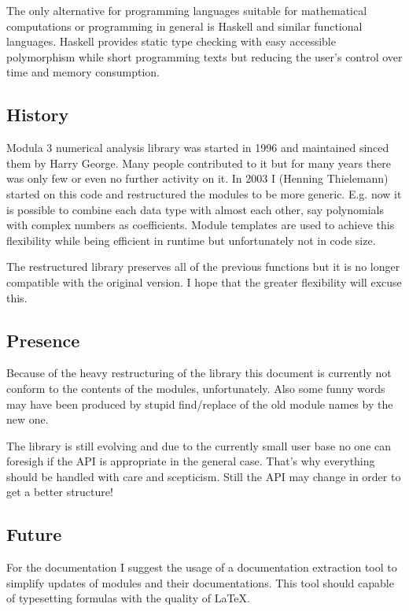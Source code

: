 The only alternative for programming languages
suitable for mathematical computations or
programming in general is Haskell and
similar functional languages.
Haskell provides static type checking
with easy accessible polymorphism
while short programming texts
but reducing the user's control over
time and memory consumption.

\subsection{History}

Modula 3 numerical analysis library was started in 1996 and
maintained sinced them by Harry George.
Many people contributed to it
but for many years there was only few or even no further activity on it.
In 2003 I (Henning Thielemann) started on this code
and restructured the modules to be more generic.
E.g. now it is possible to combine each data type with almost each other,
say polynomials with complex numbers as coefficients.
Module templates are used to achieve this flexibility
while being efficient in runtime but unfortunately not in code size.

The restructured \modna{} library preserves all of the previous functions
but it is no longer compatible with the original version.
I hope that the greater flexibility will excuse this.

\subsection{Presence}

Because of the heavy restructuring of the library
this document is currently not conform
to the contents of the modules, unfortunately.
Also some funny words may have been produced by stupid
find/replace of the old module names by the new one.

The library is still evolving and
due to the currently small user base
no one can foresigh if the API is appropriate
in the general case.
That's why everything should be handled with care and scepticism.
Still the API may change in order to get a better structure!

\subsection{Future}

For the documentation I suggest the usage
of a documentation extraction tool
to simplify updates of modules and their documentations.
This tool should capable of typesetting formulas
with the quality of \LaTeX{}.

